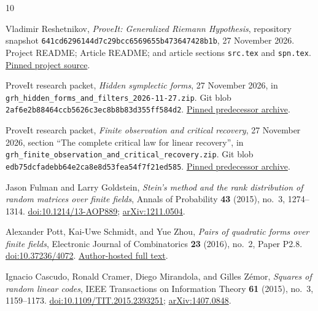 \begin{thebibliography}{10}
\raggedright
{}
Vladimir Reshetnikov, \emph{ProveIt: Generalized Riemann Hypothesis},
repository snapshot \texttt{641cd6296144d7c29bcc6569655b473647428b1b},
27 November 2026. Project README; Article README; and article sections
\texttt{src.tex} and \texttt{spn.tex}.
\href{https://github.com/VladimirReshetnikov/ProveIt/tree/641cd6296144d7c29bcc6569655b473647428b1b/Analysis/GeneralizedRiemannHypothesis}{Pinned project source}.

ProveIt research packet, \emph{Hidden symplectic forms}, 27 November 2026,
in \texttt{grh\_hidden\_forms\_and\_filters\_2026-11-27.zip}.
Git blob \texttt{2af6e2b88464ccb5626c3ec8b8b83d355ff584d2}.
\href{https://github.com/VladimirReshetnikov/ProveIt/blob/641cd6296144d7c29bcc6569655b473647428b1b/Analysis/GeneralizedRiemannHypothesis/docs/incoming/grh_hidden_forms_and_filters_2026-11-27.zip}{Pinned predecessor archive}.

ProveIt research packet, \emph{Finite observation and critical recovery},
27 November 2026, section ``The complete critical law for linear recovery'',
in \texttt{grh\_finite\_observation\_and\_critical\_recovery.zip}.
Git blob \texttt{edb75dcfadebb64e2ca8e8d53fea54f7f21ed585}.
\href{https://github.com/VladimirReshetnikov/ProveIt/blob/641cd6296144d7c29bcc6569655b473647428b1b/Analysis/GeneralizedRiemannHypothesis/docs/incoming/grh_finite_observation_and_critical_recovery.zip}{Pinned predecessor archive}.

Jason Fulman and Larry Goldstein,
\emph{Stein's method and the rank distribution of random matrices over finite
fields}, Annals of Probability \textbf{43} (2015), no.~3, 1274--1314.
\href{https://doi.org/10.1214/13-AOP889}{doi:10.1214/13-AOP889};
\href{https://arxiv.org/abs/1211.0504}{arXiv:1211.0504}.

Alexander Pott, Kai-Uwe Schmidt, and Yue Zhou,
\emph{Pairs of quadratic forms over finite fields}, Electronic Journal of
Combinatorics \textbf{23} (2016), no.~2, Paper P2.8.
\href{https://doi.org/10.37236/4072}{doi:10.37236/4072}.
\href{https://math.uni-paderborn.de/fileadmin-eim/mathematik/AG-Diskrete_Mathematik/Publications-schmidt/quad_pairs.pdf}{Author-hosted full text}.

Ignacio Cascudo, Ronald Cramer, Diego Mirandola, and Gilles Z\'emor,
\emph{Squares of random linear codes}, IEEE Transactions on Information
Theory \textbf{61} (2015), no.~3, 1159--1173.
\href{https://doi.org/10.1109/TIT.2015.2393251}{doi:10.1109/TIT.2015.2393251};
\href{https://arxiv.org/abs/1407.0848}{arXiv:1407.0848}.


\end{thebibliography}

